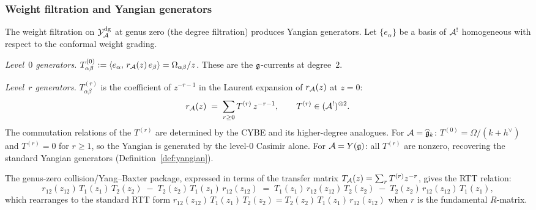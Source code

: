 \subsubsection{Weight filtration and Yangian generators}

\begin{construction}
\label{constr:thqg-V-yangian-generators}
The weight filtration on $\mathcal{Y}^{\mathrm{dg}}_{\mathcal{A}}$ at genus zero
(the degree filtration) produces Yangian generators.
Let $\{e_\alpha\}$ be a basis of $\mathcal{A}^!$ homogeneous with respect
to the conformal weight grading.

\emph{Level~$0$ generators.}
$T_{\alpha\beta}^{(0)} := \langle e_\alpha,\,r_{\mathcal{A}}(z)\,e_\beta\rangle
= \Omega_{\alpha\beta}/z$.
These are the $\mathfrak{g}$-currents at degree~$2$.

\emph{Level~$r$ generators.}
$T_{\alpha\beta}^{(r)}$ is the coefficient of $z^{-r-1}$ in the
Laurent expansion of $r_{\mathcal{A}}(z)$ at $z = 0$:
\begin{equation}\label{eq:thqg-V-yangian-generators}
r_{\mathcal{A}}(z)
\;=\;
\sum_{r \geq 0}
T^{(r)}\,z^{-r-1},
\qquad
T^{(r)} \in (\mathcal{A}^!)^{\otimes 2}.
\end{equation}
The commutation relations of the $T^{(r)}$ are determined by the
CYBE and its higher-degree analogues. For $\mathcal{A} = \widehat{\mathfrak{g}}_k$:
$T^{(0)} = \Omega/(k+h^\vee)$ and $T^{(r)} = 0$ for $r \geq 1$,
so the Yangian is generated by the level-$0$ Casimir alone.
For $\mathcal{A} = Y(\mathfrak{g})$: all $T^{(r)}$ are nonzero, recovering the
standard Yangian generators
(Definition~\ref{def:yangian}).
\end{construction}

\begin{proposition}
\label{prop:thqg-V-rtt-from-sgybe}
The genus-zero collision/Yang--Baxter package, expressed in terms
of the transfer matrix
$T_{\mathcal{A}}(z) = \sum_r T^{(r)} z^{-r}$, gives the RTT relation:
\begin{equation}\label{eq:thqg-V-rtt}
r_{12}(z_{12})\,T_1(z_1)\,T_2(z_2)
\;-\;
T_2(z_2)\,T_1(z_1)\,r_{12}(z_{12})
\;=\;
T_1(z_1)\,r_{12}(z_{12})\,T_2(z_2)
\;-\;
T_2(z_2)\,r_{12}(z_{12})\,T_1(z_1),
\end{equation}
which rearranges to the standard RTT form
$r_{12}(z_{12})\,T_1(z_1)\,T_2(z_2)
= T_2(z_2)\,T_1(z_1)\,r_{12}(z_{12})$
when $r$ is the fundamental $R$-matrix.
\end{proposition}

